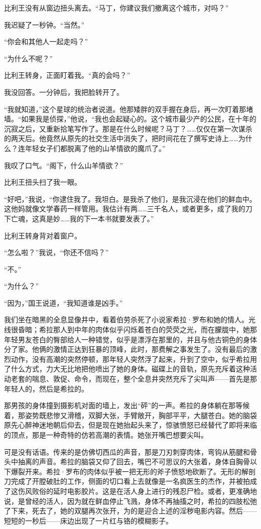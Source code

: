 \documentclass[AutoFakeBold=true]{book}
\begin{document}
比利王没有从窗边扭头离去。``马丁，你建议我们撤离这个城市，对吗？''

我迟疑了一秒钟。``当然。''

``你会和其他人一起走吗？''

``为什么不呢？''

比利王转身，正面盯着我。``真的会吗？''

我没回答。一分钟后，我把脸转开了。

``我就知道，''这个星球的统治者说道。他那矮胖的双手握在身后，再一次盯着那堵墙。``如果我是侦探，''他说，``我也会起疑心的。这个城市最少产的公民，在十年的沉寂之后，又重新拾笔写作了。那是在什么时候呢？马丁？……仅仅在第一次谋杀的两天后。他竟然从原先的社交生活中消失了，把时间花在了撰写史诗上……为什么？连年轻女子们都脱离了他的山羊情欲的魔爪了。''

我叹了口气。``阁下，什么山羊情欲？''

比利王扭头扫了我一眼。

``好吧，''我说，``你逮住我了。我坦白。是我杀了他们，是我沉浸在他们的鲜血中。这他妈就像文学春药一样管用。我估计有两……三千名人，或者更多，成了我的刀下亡魂，这真是妙……我的下一本书就要发表了。''

比利王转身背对着窗户。

``怎么啦？''我说，``你还不信吗？''

``不。''

``为什么？''

``因为，''国王说道，``我知道谁是凶手。''

\vspace*{1em}

我们坐在暗黑的全息显像井中，看着伯劳杀死了小说家希拉·罗布和她的情人。光线很昏暗；希拉那人到中年的肉体似乎闪烁着苍白的荧荧之光，而在朦胧中，她那年轻男友苍白的臀部给人一种错觉，似乎是漂浮在那里的，并且与他古铜色的身体分了家。他俩的激情正达到狂暴的顶峰，此时，那费解之事发生了。没有最后的激烈动作，没有高潮的突然停顿，那年轻人突然浮了起来，升到了空中，似乎希拉用了什么方式，力大无比地把他喷出了她的身体。磁碟上的音轨，原先充斥着这种活动老套的喘息、敦促、命令，而现在，整个全息井突然充斥了尖叫声——首先是那年轻人的，然后是希拉的。

那男孩的身体撞到摄影机对面的墙上，发出``砰''的一声。希拉的身体躺在那等候着，那姿势既悲惨又滑稽，双脚大张，手臂敞开，胸部平平，大腿苍白。她的脑袋原先心醉神迷地朝后仰去，但是现在她抬起头来了，惊骇愤怒已经替代了即将来临的顶点，那是一种奇特的仿若高潮的表情。她张开嘴巴想要尖叫。

可是没有话语。传来的是仿佛切西瓜的声音，那是刀刃刺穿肉体，弯钩从筋腱和骨头中抽离的声音。希拉的脑袋又仰了回去，嘴巴不可思议的大张着，身体自胸骨以下爆裂开来。希拉·罗布的肉体似乎被一把无形的斧子愤怒地砍断了。无形的解剖刀完成了开膛破肚的工作，侧面的切口看上去就像是一名疯医生的杰作，并被拍成了这伤风败俗的延时电影胶片。这是在活人身上进行的残忍尸检。或者，更准确地说，是曾经的活人，因为就在鲜血停止飞溅，身体不再抽搐之时，希拉的四肢松弛了下来，死去了，她的双腿再次张开，为的是迎合上述的淫秽电影内容。然后——短短的一秒后——床边出现了一片红与铬的模糊影子。
\end{document}
